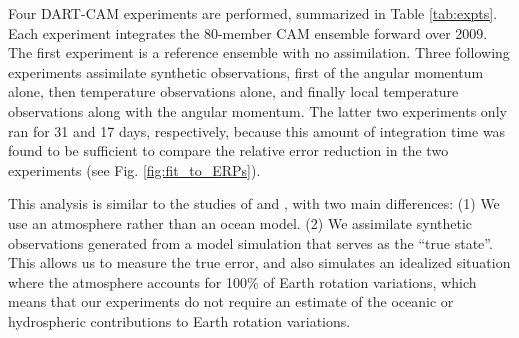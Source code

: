 Four DART-CAM experiments are performed, summarized in Table \ref{tab:expts}.
Each experiment 
integrates the  80-member CAM ensemble forward over 2009.
The first experiment is a reference ensemble with no assimilation. 
Three following experiments assimilate synthetic observations, first of the angular momentum alone, then temperature observations alone, and finally local temperature observations along with the angular momentum. 
The latter two experiments only ran for 31 and 17 days, respectively, because this amount of integration time was found to be sufficient to compare the relative error reduction in the two experiments (see Fig. \ref{fig:fit_to_ERPs}). 

This analysis is similar to the studies of \citet{Saynisch2010,Saynisch2011} and \citet{Saynisch2012}, with two main differences:
(1) We use an atmosphere rather than an ocean model.
(2) We assimilate synthetic observations generated from a model simulation that serves as the ``true state''. 
This allows us to measure the true error, and 
also simulates an idealized situation where the atmosphere accounts for 100\% of Earth rotation variations, which means that our experiments do not require an estimate of the oceanic or hydrospheric contributions to Earth rotation variations.
